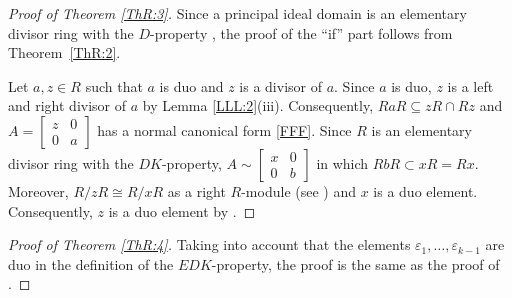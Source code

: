 \documentclass{cimart}
\begin{document}
\begin{proof}[Proof of Theorem \ref{ThR:3}]
Since a principal ideal domain is an elementary divisor ring with the $D$-property \cite[p.\,5]{1-zabavsky}, the proof of the ``if'' part follows from  Theorem~\ref{ThR:2}.

Let $a,z\in R$ such that $a$ is duo and $z$ is a divisor of $a$. Since $a$ is duo,  $z$ is a left and right divisor of $a$  by Lemma \ref{LLL:2}(iii).  Consequently,   $RaR\subseteq zR\cap Rz$ and
$A=\left[\begin{array}{cc} z & 0 \\  0 & a \end{array}\right]$  has  a normal canonical form \eqref{FFF}. Since $R$ is an elementary divisor ring with the $DK$-property,   $A\sim \left[\begin{array}{cc} x & 0 \\  0 & b \end{array}\right]$ in which  $RbR\subset xR= Rx$.  Moreover,  $R/zR\cong R/xR$ as a right $R$-module (see \cite[Theorem 2.8]{Amitsur}) and  $x$ is a duo element. Consequently,   $z$ is a duo element by \cite[Exercise 4.2.16]{9-cohn}.
\end{proof}

\begin{proof}[Proof of Theorem \ref{ThR:4}]
Taking into  account  that the elements $\varepsilon_1, \ldots, \varepsilon_{k-1}$ are  duo in the definition of the $EDK$-property, the proof is the same as  the proof of \cite[Theorem~51]{7-kaplansky}.
\end{proof}
\end{document}
